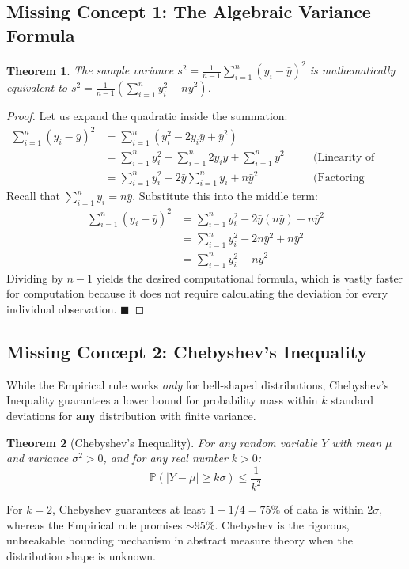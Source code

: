 \documentclass[11pt]{article}
\newtheorem{theorem}{Theorem}[section]
\theoremstyle{definition}
\theoremstyle{remark}
\newcommand{\Prob}{\mathbb{P}}
\newcommand{\samplemean}{\bar{y}}
\begin{document}
\subsection{Missing Concept 1: The Algebraic Variance Formula}
\begin{theorem}
The sample variance $s^2 = \frac{1}{n-1}\sum_{i=1}^n (y_i - \samplemean)^2$ is mathematically equivalent to $s^2 = \frac{1}{n-1} \left( \sum_{i=1}^n y_i^2 - n\samplemean^2 \right)$.
\end{theorem}
\begin{proof}
Let us expand the quadratic inside the summation:
\begin{align*}
    \sum_{i=1}^n (y_i - \samplemean)^2 &= \sum_{i=1}^n \left( y_i^2 - 2y_i\samplemean + \samplemean^2 \right) \\
    &= \sum_{i=1}^n y_i^2 - \sum_{i=1}^n 2y_i\samplemean + \sum_{i=1}^n \samplemean^2 \quad &&\text{(Linearity of summation)} \\
    &= \sum_{i=1}^n y_i^2 - 2\samplemean \sum_{i=1}^n y_i + n\samplemean^2 \quad &&\text{(Factoring constants out)}
\end{align*}
Recall that $\sum_{i=1}^n y_i = n\samplemean$. Substitute this into the middle term:
\begin{align*}
    \sum_{i=1}^n (y_i - \samplemean)^2 &= \sum_{i=1}^n y_i^2 - 2\samplemean(n\samplemean) + n\samplemean^2 \\
    &= \sum_{i=1}^n y_i^2 - 2n\samplemean^2 + n\samplemean^2 \\
    &= \sum_{i=1}^n y_i^2 - n\samplemean^2
\end{align*}
Dividing by $n-1$ yields the desired computational formula, which is vastly faster for computation because it does not require calculating the deviation for every individual observation. $\blacksquare$
\end{proof}

\subsection{Missing Concept 2: Chebyshev's Inequality}
While the Empirical rule works \textit{only} for bell-shaped distributions, Chebyshev's Inequality guarantees a lower bound for probability mass within $k$ standard deviations for \textbf{any} distribution with finite variance.
\begin{theorem}[Chebyshev's Inequality]
For any random variable $Y$ with mean $\mu$ and variance $\sigma^2 > 0$, and for any real number $k > 0$:
\[ \Prob(|Y - \mu| \ge k\sigma) \le \frac{1}{k^2} \]
\end{theorem}
For $k=2$, Chebyshev guarantees at least $1 - 1/4 = 75\%$ of data is within $2\sigma$, whereas the Empirical rule promises $\sim 95\%$. Chebyshev is the rigorous, unbreakable bounding mechanism in abstract measure theory when the distribution shape is unknown.
\end{document}
